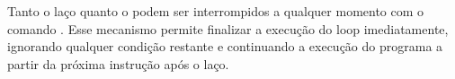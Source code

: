 Tanto o laço  quanto o  podem ser interrompidos a qualquer momento com o
comando .
Esse mecanismo permite finalizar a execução do loop imediatamente, ignorando qualquer
condição restante e continuando a execução do programa a partir da próxima instrução após o laço.










